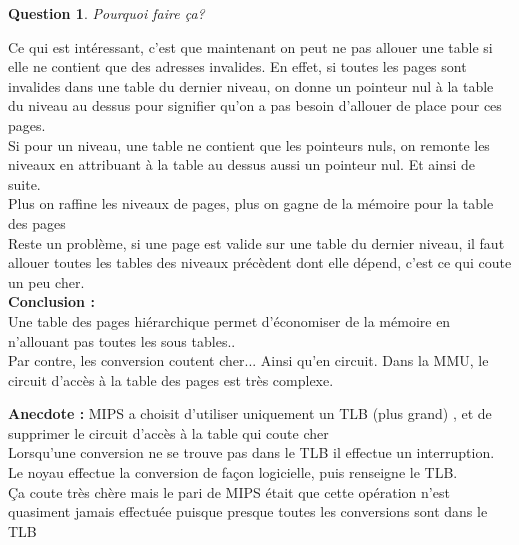 \documentclass[12pt,a4paper]{report}
\newtheorem*{q}{Question}
\begin{document}
\begin{q}Pourquoi faire ça?\end{q} 
Ce qui est intéressant, c'est que maintenant on peut ne pas allouer une table si elle ne contient que des adresses invalides. En effet, si toutes les pages sont invalides dans une table du dernier niveau, on donne un pointeur nul à la table du niveau au dessus pour signifier qu'on a pas besoin d'allouer de place pour ces pages.\\
Si pour un niveau, une table ne contient que les pointeurs nuls, on remonte les niveaux en attribuant à la table au dessus aussi un pointeur nul. Et ainsi de suite.\\
Plus on raffine les niveaux de pages, plus on gagne de la mémoire pour la table des pages\\
Reste un problème, si une page est valide sur une table du dernier niveau, il faut allouer toutes les tables des niveaux précèdent dont elle dépend, c'est ce qui coute un peu cher.\\

\textbf{Conclusion :}\\
Une table des pages hiérarchique permet d'économiser de la mémoire en n'allouant pas toutes les sous tables..\\
Par contre, les conversion coutent cher... Ainsi qu'en circuit. Dans la MMU, le circuit d'accès à la table des pages est très complexe.\\

\begin{center}
\end{center}

\textbf{Anecdote :} MIPS a choisit d’utiliser uniquement un TLB (plus grand) , et de supprimer le circuit d’accès à la table qui coute cher\\
Lorsqu'une conversion ne se trouve pas dans le TLB il effectue un interruption. Le noyau effectue la conversion de façon logicielle, puis renseigne le TLB. \\
Ça coute très chère mais le pari de MIPS était que cette opération n'est quasiment jamais effectuée puisque presque toutes les conversions sont dans le TLB
\end{document}

